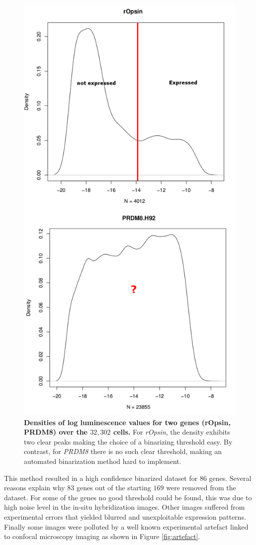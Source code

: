	\begin{figure}[H]
\centerline{\includegraphics[width=0.8\linewidth]{gfx/chapter2/densities_bina.png}}
\caption{{\bf Densities of log luminescence values for two genes (rOpsin, PRDM8) over the $32,302$ cells.} For {\it{rOpsin}}, the density exhibits two clear peaks making the choice of a binarizing threshold easy. By contrast, for {\it{PRDM8}} there is no such clear threshold, making an automated binarization method hard to implement.}\label{fig:densities_bina}
	\end{figure}
	
	This method resulted in a high confidence binarized dataset for $86$ genes. Several reasons explain why $83$ genes out of the starting $169$ were removed from the dataset. For some of the genes no good threshold could be found, this was due to high noise level in the in-situ hybridization images. Other images suffered from experimental errors that yielded blurred and unexploitable expression patterns. Finally some images were polluted by a well known experimental artefact linked to confocal microscopy imaging as shown in Figure \ref{fig:artefact}.\\
	
